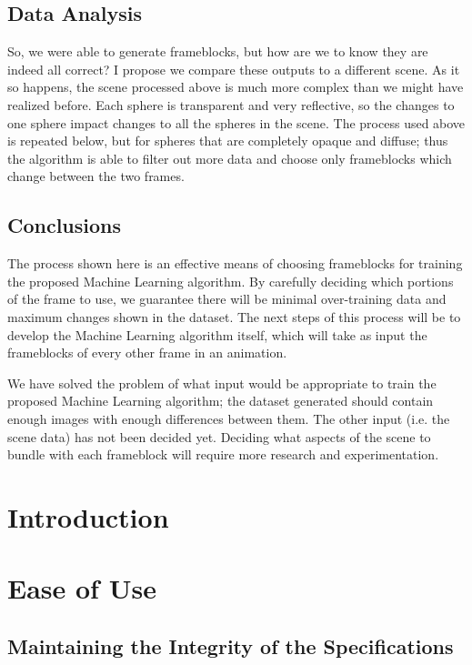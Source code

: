\documentclass[conference]{IEEEtran}
\begin{document}
\subsection{Data Analysis}
\label{subsec:data_analysis}
So, we were able to generate frameblocks, but how are we to know they are indeed all correct?
I propose we compare these outputs to a different scene.
As it so happens, the scene processed above is much more complex than we might have realized before.
Each sphere is transparent and very reflective,
so the changes to one sphere impact changes to all the spheres in the scene.
The process used above is repeated below, but for spheres that are completely opaque and diffuse;
thus the algorithm is able to filter out more data and choose only frameblocks which change between the two frames.

\subsection{Conclusions}
\label{subsec:conclusions}
The process shown here is an effective means of choosing frameblocks
for training the proposed Machine Learning algorithm.
By carefully deciding which portions of the frame to use,
we guarantee there will be minimal over-training data and maximum changes shown in the dataset.
The next steps of this process will be to develop the Machine Learning algorithm itself,
which will take as input the frameblocks of every other frame in an animation.

We have solved the problem of what input would be appropriate to train
the proposed Machine Learning algorithm;
the dataset generated should contain enough images with enough differences between them.
The other input (i.e. the scene data) has not been decided yet.
Deciding what aspects of the scene to bundle with each frameblock will require more research and experimentation.

\section{Introduction}

\section{Ease of Use}

\subsection{Maintaining the Integrity of the Specifications}
\end{document}
